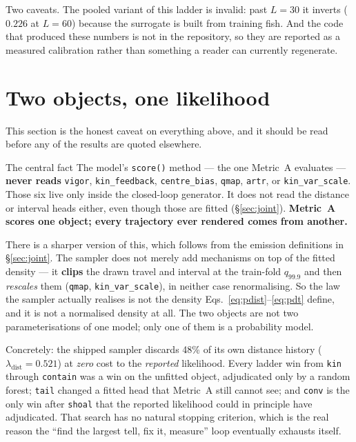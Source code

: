 \documentclass[11pt,a4paper]{article}
\newcommand{\code}[1]{\texttt{\small #1}}
\begin{document}
Two caveats. The pooled variant of this ladder is invalid: past $L=30$ it inverts
($0.226$ at $L=60$) because the surrogate is built from training fish. And the code that
produced these numbers is not in the repository, so they are reported as a measured
calibration rather than something a reader can currently regenerate.

\section{Two objects, one likelihood}\label{sec:twoobjects}

This section is the honest caveat on everything above, and it should be read before any
of the results are quoted elsewhere.

\begin{keybox}{The central fact}
The model's \code{score()} method --- the one Metric~A evaluates --- \textbf{never reads}
\code{vigor}, \code{kin\_feedback}, \code{centre\_bias}, \code{qmap}, \code{artr}, or
\code{kin\_var\_scale}. Those six live only inside the closed-loop generator. It does not
read the distance or interval heads either, even though those are fitted
(\S\ref{sec:joint}).
\textbf{Metric~A scores one object; every trajectory ever rendered comes from another.}
\end{keybox}

There is a sharper version of this, which follows from the emission definitions in
\S\ref{sec:joint}. The sampler does not merely add mechanisms on top of the fitted density
--- it \textbf{clips} the drawn travel and interval at the train-fold $q_{99.9}$ and then
\emph{rescales} them (\code{qmap}, \code{kin\_var\_scale}), in neither case renormalising.
So the law the sampler actually realises is not the density
Eqs.~\eqref{eq:pdist}--\eqref{eq:pdt} define, and it is not a normalised density at all.
The two objects are not two parameterisations of one model; only one of them is a
probability model.

Concretely: the shipped sampler discards 48\% of its own distance history
($\lambda_{\mathrm{dist}} = 0.521$) at \emph{zero} cost to the \emph{reported} likelihood.
Every ladder win from \code{kin} through \code{contain} was a win on the unfitted object,
adjudicated only by a random forest; \code{tail} changed a fitted head that Metric~A still
cannot see; and \code{conv} is the only win after \code{shoal} that the reported likelihood
could in principle have adjudicated. That search has no natural stopping criterion, which
is the real reason the ``find the largest tell, fix it, measure'' loop eventually exhausts
itself.
\end{document}
